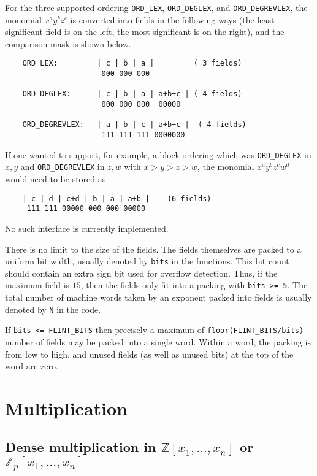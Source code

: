 \documentclass[11pt,reqno]{amsart}
\numberwithin{equation}{section}
\newcommand{\bbZ}[0]  { \mathbb{Z}}
\begin{document}
For the three supported ordering {\tt ORD\_LEX}, {\tt ORD\_DEGLEX}, and {\tt ORD\_DEGREVLEX}, the
monomial $x^a y^b z^c$ is converted into fields in the following ways (the
least significant field is on the left, the most significant is on the right),
and the comparison mask is shown below.

\begin{verbatim}
    ORD_LEX:         | c | b | a |         ( 3 fields)
                      000 000 000

    ORD_DEGLEX:      | c | b | a | a+b+c | ( 4 fields)
                      000 000 000  00000

    ORD_DEGREVLEX:   | a | b | c | a+b+c |  ( 4 fields)
                      111 111 111 0000000
\end{verbatim}

If one wanted to support, for example, a block ordering which was {\tt ORD\_DEGLEX}
in $x, y$ and {\tt ORD\_DEGREVLEX} in $z, w$ with $x>y>z>w$,
the monomial $x^a y^b z^c w^d$ would need to be stored as

\begin{verbatim}
    | c | d | c+d | b | a | a+b |    (6 fields)
     111 111 00000 000 000 00000
\end{verbatim}

No such interface is currently implemented.


There is no limit to the size of the fields. The fields themselves are packed
to a uniform bit width, usually denoted by {\tt bits} in the functions. This bit count should contain an extra sign bit used for overflow detection. Thus, if the maximum field is $15$, then the fields only fit into a packing with {\tt bits >= 5}. The total number of machine words taken by an exponent packed into fields is usually denoted by {\tt N} in the code.

If {\tt bits <= FLINT\_BITS} then precisely a maximum of {\tt floor(FLINT\_BITS/bits)} number of fields may be packed into a single word. Within a word, the packing is from low to high, and unused fields (as well as unused bits) at the top of the word are zero.

\section{Multiplication}
\subsection{Dense multiplication in $\bbZ[x_1,\dots,x_n]$ or $\bbZ_p[x_1,\dots,x_n]$}\
\end{document}
